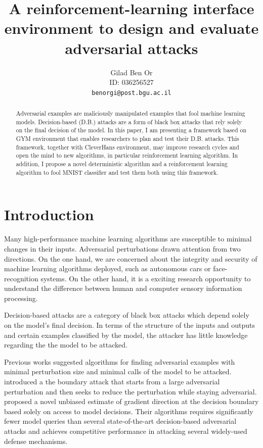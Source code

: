 \documentclass{article}
\title{A reinforcement-learning interface environment to design and evaluate adversarial attacks}
\author{
  Gilad Ben Or\\
  ID: 036256527\\
  \texttt{benorgi@post.bgu.ac.il} \\
  }
\begin{document}
\maketitle

\begin{abstract}
Adversarial examples are maliciously manipulated examples that fool machine learning models. Decision-based (D.B.) attacks are a form of black box attacks that rely solely on the final decision of the model. In this paper, I am presenting a framework based on  GYM environment that enables researchers to plan and test their D.B. attacks. This framework, together with CleverHans environment, may improve research cycles and open the mind to new algorithms, in particular reinforcement learning algorithm.
In addition, I propose a novel deterministic algorithm and a reinforcement learning algorithm to fool MNIST classifier and test them both using this framework.
\end{abstract}


\section{Introduction}
Many high-performance machine learning algorithms are susceptible to minimal changes in their inputs. Adversarial perturbations drawn attention from two directions. On the one hand, we are concerned about the integrity and security of machine learning algorithms deployed, such as autonomous cars or face-recognition systems. On the other hand, it is a exciting research opportunity to understand the difference between human and computer sensory information processing.

Decision-based attacks are a category of black box attacks which depend solely on the model's final decision. In terms of the structure of the inputs and outputs and certain examples classified by the model, the attacker has little knowledge regarding the  the model to be attacked.

Previous works suggested algorithms for finding adversarial examples with minimal perturbation size and minimal calls of the model to be attacked. \cite{brendel2017decision} introduced a the boundary attack that starts from a large adversarial perturbation and then seeks to reduce the perturbation while staying adversarial. \cite{chen2019hopskipjumpattack} proposed a novel unbiased estimate of gradient direction at the decision boundary based solely on access to model decisions. Their algorithms requires significantly fewer model queries than several state-of-the-art decision-based adversarial attacks and achieves competitive performance in attacking several widely-used defense mechanisms.
\end{document}
